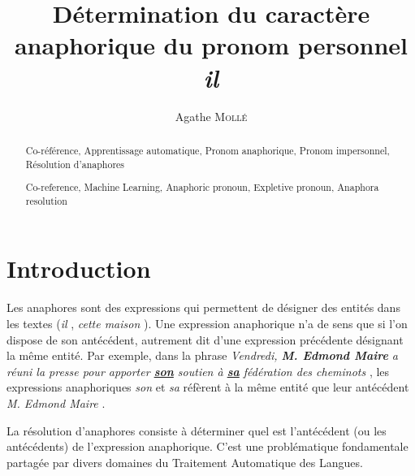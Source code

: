 \documentclass[a4paper,12pt]{article}
\title{Détermination du caractère anaphorique du pronom personnel \og{}\textit{il}\fg{}}
\author{Agathe \textsc{Mollé}}
\date{}
\begin{document}
\maketitle

\begin{abstract}

\end{abstract}


\renewcommand\abstractname{Abstract}
\begin{abstract}

\end{abstract}


\paragraph{}

\renewcommand\abstractname{Mots-clés}
\begin{abstract}
Co-référence, Apprentissage automatique, Pronom anaphorique, Pronom impersonnel, Résolution d'anaphores
\end{abstract}

\renewcommand\abstractname{Keywords}
\begin{abstract}
Co-reference, Machine Learning, Anaphoric pronoun, Expletive pronoun, Anaphora resolution
\end{abstract}

\section*{Introduction}

Les anaphores sont des expressions qui permettent de désigner des entités dans les textes (\og \textit{il} \fg{}, \og \textit{cette maison} \fg{}). Une expression anaphorique n'a de sens que si l'on dispose de son antécédent, autrement dit d'une expression précédente désignant la même entité. Par exemple, dans la phrase \og \textit{Vendredi, \textbf{M. Edmond Maire} a réuni la presse pour apporter \underline{\textbf{son}} soutien à \underline{\textbf{sa}} fédération des cheminots} \fg{}, les expressions anaphoriques \og \textit{son} \fg{} et \og \textit{sa} \fg{} réfèrent à la même entité que leur antécédent \og \textit{M. Edmond Maire} \fg{}.

La résolution d'anaphores consiste à déterminer quel est l'antécédent (ou les antécédents) de l'expression anaphorique. C'est une problématique fondamentale partagée par divers domaines du Traitement Automatique des Langues.
\end{document}
